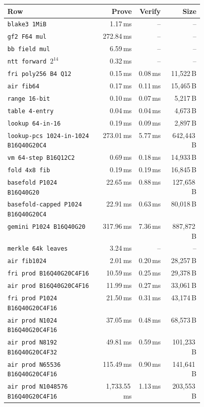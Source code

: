\documentclass[11pt,a4paper]{article}
\begin{document}
\begin{longtable}{@{}L{0.46\linewidth}rrr@{}}
\toprule
Row & Prove & Verify & Size \\
\midrule
\endhead
\texttt{blake3 1MiB} & 1.17\,ms & -- & -- \\
\texttt{gf2 F64 mul} & 272.84\,ms & -- & -- \\
\texttt{bb field mul} & 6.59\,ms & -- & -- \\
\texttt{ntt forward }$2^{14}$ & 0.32\,ms & -- & -- \\
\texttt{fri poly256 B4 Q12} & 0.15\,ms & 0.08\,ms & 11,522\,B \\
\texttt{air fib64} & 0.17\,ms & 0.11\,ms & 15,465\,B \\
\texttt{range 16-bit} & 0.10\,ms & 0.07\,ms & 5,217\,B \\
\texttt{table 4-entry} & 0.04\,ms & 0.04\,ms & 4,673\,B \\
\texttt{lookup 64-in-16} & 0.19\,ms & 0.09\,ms & 2,897\,B \\
\texttt{lookup-pcs 1024-in-1024 B16Q40G20C4} & 273.01\,ms & 5.77\,ms & 642,443\,B \\
\texttt{vm 64-step B16Q12C2} & 0.69\,ms & 0.18\,ms & 14,933\,B \\
\texttt{fold 4x8 fib} & 0.19\,ms & 0.19\,ms & 16,845\,B \\
\texttt{basefold P1024 B16Q40G20} & 22.65\,ms & 0.88\,ms & 127,658\,B \\
\texttt{basefold-capped P1024 B16Q40G20C4} & 22.91\,ms & 0.63\,ms & 80,018\,B \\
\texttt{gemini P1024 B16Q40G20} & 317.96\,ms & 7.36\,ms & 887,872\,B \\
\texttt{merkle 64k leaves} & 3.24\,ms & -- & -- \\
\texttt{air fib1024} & 2.01\,ms & 0.20\,ms & 28,257\,B \\
\texttt{fri prod B16Q40G20C4F16} & 10.59\,ms & 0.25\,ms & 29,378\,B \\
\texttt{air prod B16Q40G20C4F16} & 11.99\,ms & 0.27\,ms & 33,061\,B \\
\texttt{fri prod P1024 B16Q40G20C4F16} & 21.50\,ms & 0.31\,ms & 43,174\,B \\
\texttt{air prod N1024 B16Q40G20C4F16} & 37.05\,ms & 0.48\,ms & 68,573\,B \\
\texttt{air prod N8192 B16Q40G20C4F32} & 49.81\,ms & 0.59\,ms & 101,233\,B \\
\texttt{air prod N65536 B16Q40G20C4F16} & 115.49\,ms & 0.90\,ms & 141,641\,B \\
\texttt{air prod N1048576 B16Q40G20C4F16} & 1,733.55\,ms & 1.13\,ms & 203,553\,B \\
\bottomrule
\end{longtable}
\end{document}
